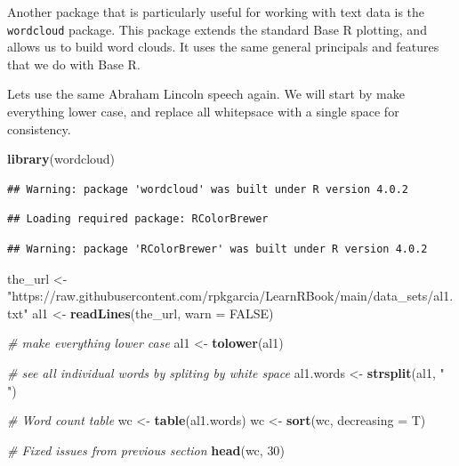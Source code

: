 \documentclass[
]{book}
\newenvironment{Shaded}{\begin{snugshade}}{\end{snugshade}}
\newcommand{\CommentTok}[1]{\textcolor[rgb]{0.56,0.35,0.01}{\textit{#1}}}
\newcommand{\DataTypeTok}[1]{\textcolor[rgb]{0.13,0.29,0.53}{#1}}
\newcommand{\DecValTok}[1]{\textcolor[rgb]{0.00,0.00,0.81}{#1}}
\newcommand{\KeywordTok}[1]{\textcolor[rgb]{0.13,0.29,0.53}{\textbf{#1}}}
\newcommand{\NormalTok}[1]{#1}
\newcommand{\OtherTok}[1]{\textcolor[rgb]{0.56,0.35,0.01}{#1}}
\newcommand{\StringTok}[1]{\textcolor[rgb]{0.31,0.60,0.02}{#1}}
\begin{document}
Another package that is particularly useful for working with text data is the \texttt{wordcloud} package. This package extends the standard Base R plotting, and allows us to build word clouds. It uses the same general principals and features that we do with Base R.

Lets use the same Abraham Lincoln speech again. We will start by make everything lower case, and replace all whitepsace with a single space for consistency.

\begin{Shaded}
\begin{Highlighting}[]
\KeywordTok{library}\NormalTok{(wordcloud)}
\end{Highlighting}
\end{Shaded}

\begin{verbatim}
## Warning: package 'wordcloud' was built under R version 4.0.2
\end{verbatim}

\begin{verbatim}
## Loading required package: RColorBrewer
\end{verbatim}

\begin{verbatim}
## Warning: package 'RColorBrewer' was built under R version 4.0.2
\end{verbatim}

\begin{Shaded}
\begin{Highlighting}[]
\NormalTok{the_url <-}\StringTok{ "https://raw.githubusercontent.com/rpkgarcia/LearnRBook/main/data_sets/al1.txt"}
\NormalTok{al1 <-}\StringTok{ }\KeywordTok{readLines}\NormalTok{(the_url, }\DataTypeTok{warn =} \OtherTok{FALSE}\NormalTok{)}

\CommentTok{# make everything lower case}
\NormalTok{al1 <-}\StringTok{ }\KeywordTok{tolower}\NormalTok{(al1)}

\CommentTok{# see all individual words by spliting by white space}
\NormalTok{al1.words <-}\StringTok{ }\KeywordTok{strsplit}\NormalTok{(al1, }\StringTok{" "}\NormalTok{)}

\CommentTok{# Word count table}
\NormalTok{wc <-}\StringTok{ }\KeywordTok{table}\NormalTok{(al1.words)}
\NormalTok{wc <-}\StringTok{ }\KeywordTok{sort}\NormalTok{(wc, }\DataTypeTok{decreasing =}\NormalTok{ T)}

\CommentTok{# Fixed issues from previous section}
\KeywordTok{head}\NormalTok{(wc, }\DecValTok{30}\NormalTok{)}
\end{Highlighting}
\end{Shaded}
\end{document}
